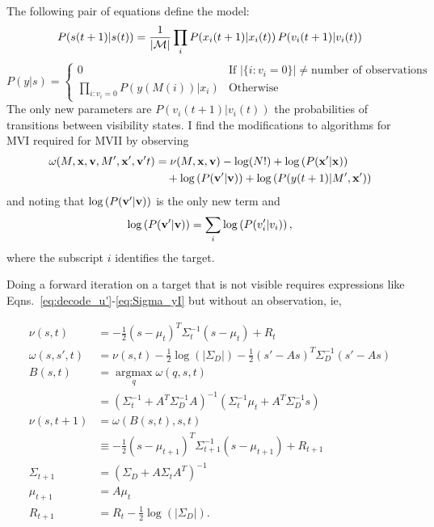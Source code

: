 \documentclass[11pt]{article}
\newcommand{\M}{{\cal M}}
\newcommand{\ti}[2]{{#1}{(#2)}}                         %
\newcommand{\argmax}{\operatorname*{argmax}}
\begin{document}
The following pair of equations define the model:
\begin{equation}
  P(\ti{s}{t+1}|\ti{s}{t}) = \frac{1}{\left| \M \right|} \prod_i
  P(\ti{x_i}{t+1}|\ti{x_i}{t})\, P(\ti{v_i}{t+1}|\ti{v_i}{t})
\end{equation}
\begin{equation}
  P(y|s) =
  \begin{cases}
    0 & \text{If } \left| \{i:v_i=0 \} \right| \neq \text{number of
      observations} \\
    \prod_{i:v_i=0} P(y(M(i))|x_i) & \text{Otherwise}
  \end{cases}
\end{equation}
The only new parameters are $P(\ti{v_i}{t+1}|\ti{v_i}{t})$ the
probabilities of transitions between visibility states.  I find the
modifications to algorithms for MVI required for MVII by observing
\begin{align}
  \omega(M,\bx,\bv,M',\bx',\bv't) &= \nu(M,\bx,\bv) - \log(N!) + \log \left(
    P(\bx'|\bx)\right) \nonumber \\
  & \quad + \log \left( P(\bv'|\bv)\right) + \log \left(
  P(\ti{y}{t+1}|M',\bx')\right)
\end{align}
and noting that $\log \left( P({\mathbf{v}}'|{\mathbf{v}})\right)$ is the only new term
and
\begin{equation}
  \label{eq:1}
   \log \left( P({\mathbf{v}}'|{\mathbf{v}})\right) = \sum_i \log \left(
     P(v_i'|v_i)\right),
\end{equation}
where the subscript $i$ identifies the target.

Doing a forward iteration on a target that is not visible requires
expressions like Eqns.~\eqref{eq:decode_u'}-\eqref{eq:Sigma_yI} but
without an observation, ie,

\begin{align}
  \nu(s,t) &= -\frac{1}{2}(s-\mu_{t})^T
    \Sigma_{t}^{-1}(s-\mu_{t}) + R_t \nonumber \\
  \omega(s,s',t) &= \nu(s,t) -\frac{1}{2} \log(\left|\Sigma_D\right|)  - 
  \frac{1}{2}(s'-As)^T \Sigma_{D}^{-1} (s'-As)  \nonumber \\
  B(s,t) &= \argmax_{q} \omega(q,s,t) \nonumber \\
  &= \left( \Sigma_t^{-1} + A^T \Sigma_D^{-1} A \right)^{-1} \left(
    \Sigma_t^{-1} \mu_t + A^T \Sigma_D^{-1} s \right) \nonumber \\
  \nu(s,t+1) &= \omega(B(s,t),s,t) \nonumber \\
  &\equiv -\frac{1}{2}(s-\mu_{t+1})^T
  \Sigma_{t+1}^{-1}(s-\mu_{t+1}) + R_{t+1} \nonumber \\
  \label{eq:new_Sigma_noy}
  \Sigma_{t+1} & = \left( \Sigma_D + A \Sigma_tA^T \right)^{-1} \\
  \label{eq:new_mu_noy}
  \mu_{t+1} &= A \mu_t \\
  \label{eq:new_R_noy}
  R_{t+1} &= R_t -\frac{1}{2}  \log(\left|\Sigma_D\right|).
\end{align}
\end{document}
